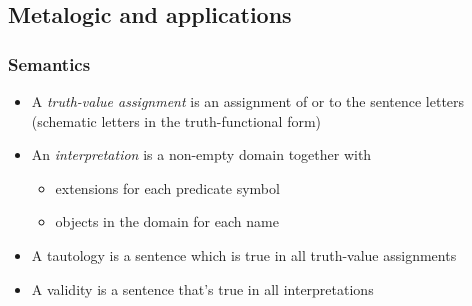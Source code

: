



\subsection{Metalogic and applications}

\begin{frame}
    \frametitle{Semantics}

\begin{itemize}[<+->]
\item A \emph{truth-value assignment} is an assignment of \True{} or \False{} to the sentence letters (schematic letters in the truth-functional form)
\item An \emph{interpretation} is a non-empty domain together with
\begin{itemize}[<+->]
\item extensions for each predicate symbol
\item objects in the domain for each name
\end{itemize}
\item A tautology is a sentence which is true in all truth-value assignments
\item A validity is a sentence that's true in all interpretations
\end{itemize}
\end{frame}


